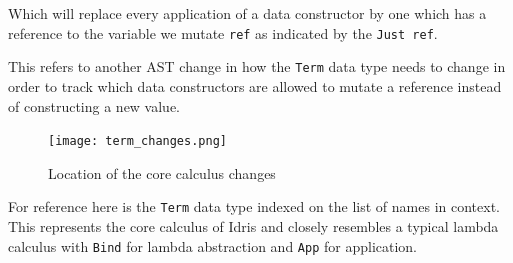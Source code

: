 \documentclass[
]{article}
\newenvironment{Shaded}{}{}
\newcommand{\CommentTok}[1]{\textcolor[rgb]{0.38,0.63,0.69}{\textit{#1}}}
\newcommand{\DataTypeTok}[1]{\textcolor[rgb]{0.56,0.13,0.00}{#1}}
\newcommand{\FunctionTok}[1]{\textcolor[rgb]{0.02,0.16,0.49}{#1}}
\newcommand{\KeywordTok}[1]{\textcolor[rgb]{0.00,0.44,0.13}{\textbf{#1}}}
\newcommand{\NormalTok}[1]{#1}
\newcommand{\OperatorTok}[1]{\textcolor[rgb]{0.40,0.40,0.40}{#1}}
\newcommand{\OtherTok}[1]{\textcolor[rgb]{0.00,0.44,0.13}{#1}}
\begin{document}
\begin{Shaded}
\end{Shaded}

Which will replace every application of a data constructor by one which
has a reference to the variable we mutate \texttt{ref} as indicated by
the \texttt{Just\ ref}.

This refers to another AST change in how the \texttt{Term} data type
needs to change in order to track which data constructors are allowed to
mutate a reference instead of constructing a new value.

\begin{figure}
\centering
\texttt{[image: term\_changes.png]}
\caption{Location of the core calculus changes}
\end{figure}

For reference here is the \texttt{Term} data type indexed on the list of
names in context. This represents the core calculus of Idris and closely
resembles a typical lambda calculus with \texttt{Bind} for lambda
abstraction and \texttt{App} for application.
\end{document}
